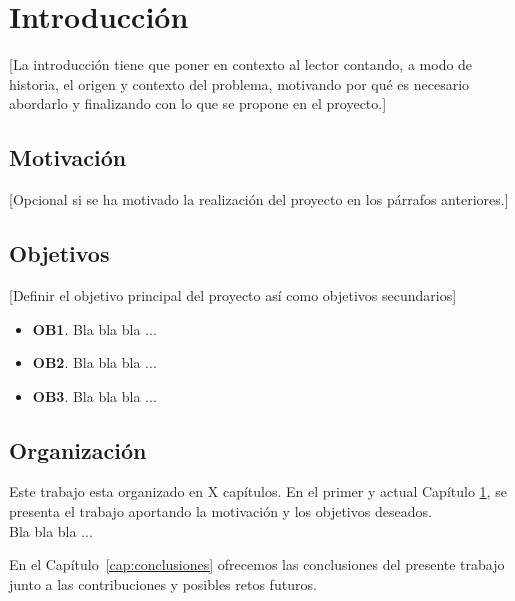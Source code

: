 \chapter{Introducción}\label{cap:introduccion}
[La introducción tiene que poner en contexto al lector contando, a modo de historia, el origen y contexto del problema, motivando por qué es necesario abordarlo y finalizando con lo que se propone en el proyecto.]
\section{Motivación}
[Opcional si se ha motivado la realización del proyecto en los párrafos anteriores.]

\section{Objetivos}\label{sec:objetivos}

[Definir el objetivo principal del proyecto así como objetivos secundarios]

\begin{itemize}
    \item \textbf{OB1}. Bla bla bla ...
    \item \textbf{OB2}. Bla bla bla ...
    \item \textbf{OB3}. Bla bla bla ...
\end{itemize}

\section{Organización}

Este trabajo esta organizado en X capítulos. En el primer y actual Capítulo \ref{cap:introduccion}, se presenta el trabajo aportando la motivación y los objetivos deseados.\\

Bla bla bla ...

En el Capítulo~\ref{cap:conclusiones} ofrecemos las conclusiones del presente trabajo junto a las contribuciones y posibles retos futuros.